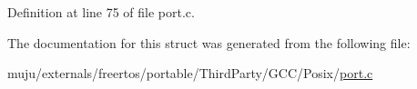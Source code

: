 Definition at line 75 of file port.\+c.



The documentation for this struct was generated from the following file\+:\begin{DoxyCompactItemize}
\item 
muju/externals/freertos/portable/\+Third\+Party/\+G\+C\+C/\+Posix/\hyperlink{externals_2freertos_2portable_2_third_party_2_g_c_c_2_posix_2port_8c}{port.\+c}\end{DoxyCompactItemize}
